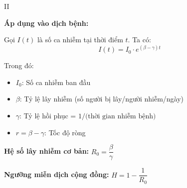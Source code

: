 \documentclass[12pt,a4paper]{article}
\begin{document}
\begin{competitionsection}{II}
\begin{problembox}
\textbf{\large Áp dụng vào dịch bệnh:}

Gọi $I(t)$ là số ca nhiễm tại thời điểm $t$. Ta có:
$$I(t) = I_0 \cdot e^{(\beta - \gamma)t}$$

Trong đó:
\begin{itemize}
\item $I_0$: Số ca nhiễm ban đầu
\item $\beta$: Tỷ lệ lây nhiễm (số người bị lây/người nhiễm/ngày)
\item $\gamma$: Tỷ lệ hồi phục = $1/\text{(thời gian nhiễm bệnh)}$
\item $r = \beta - \gamma$: Tốc độ ròng
\end{itemize}

\textbf{Hệ số lây nhiễm cơ bản:} $R_0 = \dfrac{\beta}{\gamma}$

\textbf{Ngưỡng miễn dịch cộng đồng:} $H = 1 - \dfrac{1}{R_0}$
\end{problembox}

\end{competitionsection}
\newpage
\end{document}
